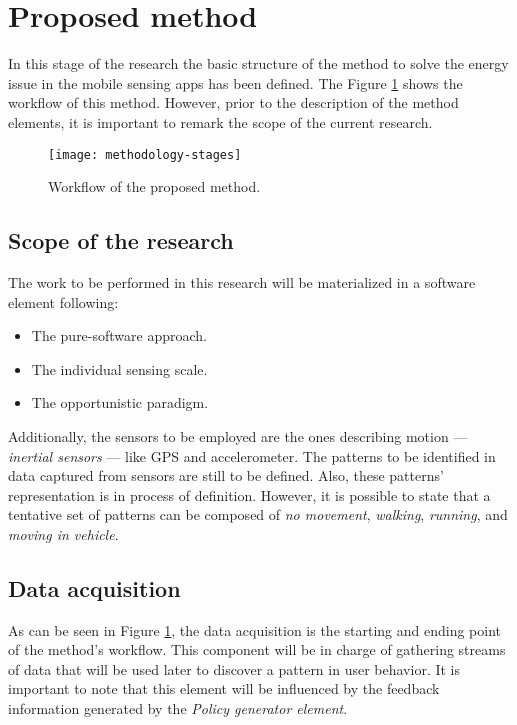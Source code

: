 \section{Proposed method}
\label{sec:proposed_method}

In this stage of the research the basic structure of the method to solve the energy issue in the mobile sensing apps has been defined.
The Figure \ref{fig:methodology-stages} shows the workflow of this method.
However, prior to the description of the method elements, it is important to remark the scope of the current research.

\begin{figure}
\centering
\texttt{[image: methodology-stages]}
\caption[Workflow of the proposed method]{Workflow of the proposed method.}
\label{fig:methodology-stages}
\end{figure}

\subsection{Scope of the research} 
\label{sub:scope_of_the_research}

The work to be performed in this research will be materialized in a software element following:
\begin{itemize}
	\item The pure-software approach.
	\item The individual sensing scale.
	\item The opportunistic paradigm.
\end{itemize}

Additionally, the sensors to be employed are the ones describing motion --- \emph{inertial sensors} --- like GPS and accelerometer.
The patterns to be identified in data captured from sensors are still to be defined.
Also, these patterns' representation is in process of definition.
However, it is possible to state that a tentative set of patterns can be composed of \emph{no movement}, \emph{walking}, \emph{running}, and \emph{moving in vehicle}.

\subsection{Data acquisition} 
\label{sub:data_acquisition}
As can be seen in Figure \ref{fig:methodology-stages}, the data acquisition is the starting and ending point of the method's workflow.
This component will be in charge of gathering streams of data that will be used later to discover a pattern in user behavior.
It is important to note that this element will be influenced by the feedback information generated by the \emph{Policy generator element}.

